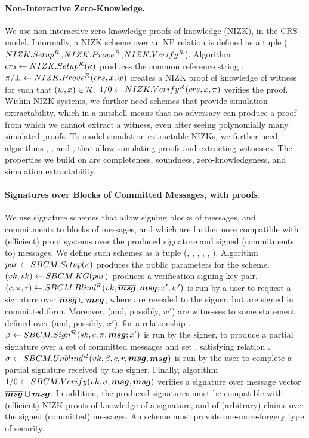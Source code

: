 \paragraph{Non-Interactive Zero-Knowledge.} %
We use non-interactive zero-knowledge proofs of knowledge (NIZK), in the CRS
model. Informally, a NIZK scheme over an NP relation \NIZKRel is defined as a
tuple ($NIZK.Setup^{\mathcal{R}}$,$NIZK.Prove^{\mathcal{R}}$,$NIZK.Verify^\mathcal{R}$).
Algorithm $crs \gets NIZK.Setup^{\mathcal{R}}(\kappa)$ produces the common
reference string \NIZKcrs. $\pi/\bot \gets NIZK.Prove^{\mathcal{R}}(crs,
x,w)$ creates a NIZK proof of knowledge of witness \NIZKw for \NIZKx
such that $(w,x) \in \mathcal{R}$. $1/0 \gets NIZK.Verify^{\mathcal{R}}
(crs,x,\pi)$ verifies the proof. Within NIZK systems, we
further need schemes that provide simulation extractability, which in a nutshell
means that no adversary can produce a proof from which we cannot extract a
witness, even after seeing polynomially many simulated proofs. To model
simulation extractable NIZKs, we further need algorithms \NIZKSimSetup,
\NIZKSim, and \NIZKExtract, that allow simulating proofs and extracting
witnesses. The properties we build on are completeness, soundness,
zero-knowledgeness, and simulation extractability.

\paragraph{Signatures over Blocks of Committed Messages, with proofs.} %
We use signature schemes that allow signing blocks of messages, and commitments
to blocks of messages, and which are furthermore compatible with (efficient)
proof systems over the produced signature and signed (commitments to) messages.
We define such schemes as a tuple (\SBCMSetup, \SBCMKeyGen,
\SBCMBlind, \SBCMSign, \SBCMUnblind, \SBCMVerify).
%
Algorithm $par \gets SBCM.Setup(\kappa)$ produces the public parameters for
the scheme.
% 
$(vk,sk) \gets SBCM.KG(par)$ produces a verification-signing key pair.
%
$(c,\pi,r) \gets SBCM.Blind^{\mathcal{R}}(vk,\overline{\boldsymbol{msg}},\boldsymbol{msg};x',w')$ is run by a
user to request a signature over $\overline{\boldsymbol{msg}} \cup \boldsymbol{msg}$, where \smsg are revealed
to the signer, but \osmsg are signed in committed form.
Moreover, \osmsg (and, possibly, $w'$) are witnesses to some statement defined
over \smsg (and, possibly, $x'$), for a relationship \NIZKRel.
%
$\beta \gets SBCM.Sign^{\mathcal{R}}(sk,c,\pi,\boldsymbol{msg}; x')$ is run by the
signer, to produce a partial signature \bsig over a set of committed
messages \osmsg and set \smsg, satisfying relation \NIZKRel.
%
$\sigma \gets SBCM.Unblind^{\mathcal{R}}(vk,\beta,c,r,\overline{\boldsymbol{msg}},\boldsymbol{msg})$ is
run by the user to complete a partial signature \bsig received by the
signer.
%
Finally, algorithm $1/0 \gets SBCM.Verify(vk,\sigma,\overline{\boldsymbol{msg}},\boldsymbol{msg})$ verifies a
signature \sig over message vector $\overline{\boldsymbol{msg}} \cup \boldsymbol{msg}$.
%
In addition, the produced signatures must be compatible with (efficient) NIZK
proofs of knowledge of a signature, and of (arbitrary) claims over the signed
(committed) messages. An \SBCM scheme must provide one-more-forgery type of
security.

